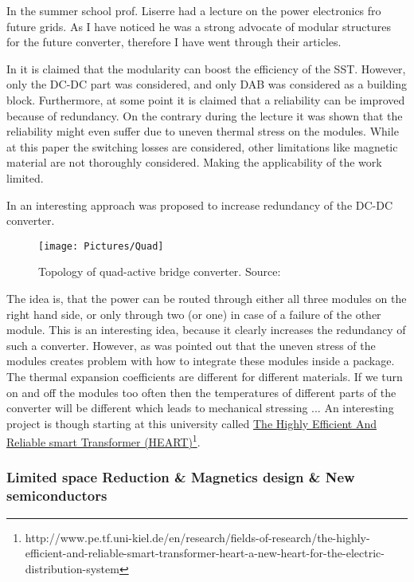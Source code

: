 \documentclass[]{scrartcl}
\begin{document}
In the summer school prof. Liserre had a lecture on the power electronics fro future grids. As I have noticed he was a strong advocate of modular structures for the future converter, therefore I have went through their articles. 




In \cite{Quartarone} it is claimed that the modularity can boost the efficiency of the SST. However, only the DC-DC part was considered, and only DAB was considered as a building block.  Furthermore, at some point it is claimed that a reliability can be improved because of redundancy. On the contrary during the lecture it was shown that the reliability might even suffer due to uneven thermal stress on the modules. While at this paper the switching losses are considered, other limitations like magnetic material are not thoroughly considered. Making the applicability of the work limited. 

In \cite{Costa2015} an interesting approach was proposed to increase redundancy of the DC-DC converter. 
\begin{figure}[h!]
	\centering
	\texttt{[image: Pictures/Quad]}
	\caption{Topology of quad-active bridge converter. Source: \cite{Costa2015}}
	\label{fig:Quad}
\end{figure}

The idea is, that the power can be routed through either all three modules on the right hand side, or only through two (or one) in case of a failure of  the other module. This is an interesting idea, because it clearly increases the redundancy of such a converter. However, as was pointed out that the uneven stress of the modules creates problem with how to integrate these modules inside a package. The thermal expansion coefficients are different for different materials. If we  turn on and off the modules too often then the temperatures of different parts of the converter will be different which leads to mechanical stressing ... An interesting project is though starting at this university called \href{<http://www.pe.tf.uni-kiel.de/en/research/fields-of-research/the-highly-efficient-and-reliable-smart-transformer-heart-a-new-heart-for-the-electric-distribution-system>}{The Highly Efficient And Reliable smart Transformer (HEART)}\footnote{http://www.pe.tf.uni-kiel.de/en/research/fields-of-research/the-highly-efficient-and-reliable-smart-transformer-heart-a-new-heart-for-the-electric-distribution-system}.

\subsubsection{Limited space Reduction \& Magnetics design \& New semiconductors}
\end{document}
